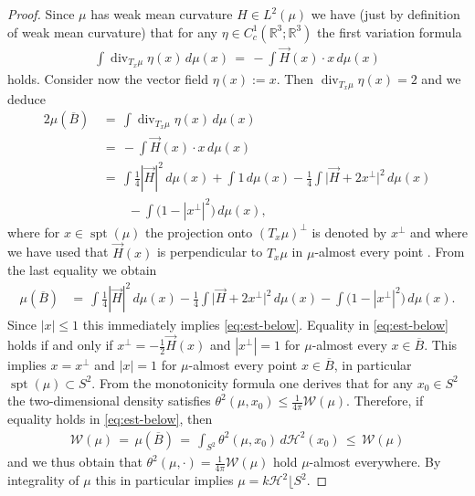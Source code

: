 \documentclass[reqno,makeidx,12pt]{amsart}
\theoremstyle{note}
\theoremstyle{definition}
\begin{document}
\begin{proof}
Since $\mu$ has weak mean curvature $H\in L^2(\mu)$ we have (just by definition of weak mean curvature)  that for any $\eta\in C^1_c({\mathbb R}^3;{\mathbb R}^3)$ the first variation formula
\begin{gather*}
	\int \operatorname{div}_{T_x\mu}\eta(x)\,d\mu(x)\,=\, -\int  \vec{H}(x)\cdot x\,d\mu(x)
\end{gather*}
holds. Consider now the vector field
$\eta(x):=x$. Then $\operatorname{div}_{T_x\mu}\eta(x)=2$ and we deduce
\begin{align*}
  2\mu(\overline{B})\,&=\, \int \operatorname{div}_{T_x\mu}\eta(x)\,d\mu(x)\\
  &=\, -\int
  \vec{H}(x)\cdot x\,d\mu(x) \\
  &=\, \int \frac{1}{4} |\vec{H}|^2\,d\mu(x) +\int 1
  \,d\mu(x)-\frac{1}{4}\int \big|\vec{H}+2x^\perp\big|^2\,d\mu(x) \\
  &\qquad - \int \big(1-|x^\perp|^2\big)\,d\mu(x),
\end{align*}
where for $x\in \operatorname{spt}(\mu)$ the projection onto $(T_x\mu)^\perp$ is denoted by $x^\perp$ and where we have used that $\vec{H}(x)$ is perpendicular to $T_x\mu$ in $\mu$-almost every point \cite[Thm 5.8]{Brak78}. 
From the last equality we obtain
\begin{align}
  \mu(\overline{B}) &=\, \int \frac{1}{4} |\vec{H}|^2\,d\mu(x) -\frac{1}{4}\int \big|\vec{H}+2 x^\perp\big|^2\,d\mu(x) 
   - \int \big(1-|x^\perp|^2\big)\,d\mu(x). \label{eq:est-below-1} 
\end{align}
Since $|x|\leq 1$ this immediately implies \eqref{eq:est-below}.
Equality in \eqref{eq:est-below} holds if and only if $x^\perp=-\frac{1}{2}\vec{H}(x)$ and $|x^\perp|=1$ for  $\mu$-almost every $x\in \overline{B}$. This implies $x=x^\perp $ and $|x|=1$ for $\mu$-almost every point $x\in\overline{B}$, in particular $\operatorname{spt}(\mu)\subset S^2$. 
From the monotonicity formula one derives \cite[(A.17)]{KuSc04} that for any $x_0\in S^2$  the two-dimensional density satisfies $\theta^2(\mu,x_0)\leq \frac{1}{4\pi}{\mathcal{W}}(\mu)$. Therefore, if equality holds in \eqref{eq:est-below}, then
\begin{gather*}
	{\mathcal{W}}(\mu) \,=\, \mu(\overline{B})\,=\, \int_{S^2} \theta^2(\mu,x_0) \,d{\ensuremath{\mathcal{H}}}^2(x_0)\,\leq\, {\mathcal{W}}(\mu)
\end{gather*}
and we thus obtain that $\theta^2(\mu,\cdot)=\frac{1}{4\pi}{\mathcal{W}}(\mu)$ hold $\mu$-almost everywhere. By integrality of $\mu$ this in particular implies $\mu=  k {\ensuremath{\mathcal{H}}}^2\lfloor S^2$.
\end{proof}
\end{document}
